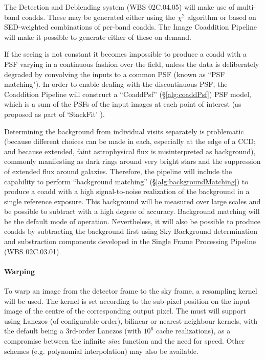 \documentclass[12pt]{article}
\newcommand{\wbsSFM}{WBS 02C.03.01}
\newcommand{\wbsDetDeblend}{WBS 02C.04.05}
\begin{document}
The Detection and Deblending system (\wbsDetDeblend) will make use of multi-band coadds. These may be generated either using the $\chi^2$ algorithm \cite{Szalay99} or based on SED-weighted combinations of per-band coadds. The Image Coaddition Pipeline will make it possible to generate either of these on demand.

If the seeing is not constant it becomes impossible to produce a coadd with a PSF varying in a continuous fashion over the field, unless the data is deliberately degraded by convolving the inputs to a common PSF (known as ``PSF matching").  In order to enable dealing with the discontinuous PSF, the Coaddition Pipeline will construct a ``CoaddPsf'' (\S\ref{alg:coaddPsf}) PSF model, which is a sum of the PSFs of the input images at each point of interest (as proposed as part of `StackFit' \cite{Jee13}).

Determining the background from individual visits separately is problematic (because different choices can be made in each, especially at the edge of a CCD; and because extended, faint astrophysical flux is misinterpreted as background), commonly manifesting as dark rings around very bright stars and the suppression of extended flux around galaxies. Therefore, the pipeline will include the capability to perform ``background matching'' (\S\ref{alg:backgroundMatching}) to produce a coadd with a high signal-to-noise realization of the background in a single reference exposure.  This background will be measured over large scales and be possible to subtract with a high degree of accuracy. Background matching will be the default mode of operation. Nevertheless, it will also be possible to produce coadds by subtracting the background first using Sky Background determination and substraction components developed in the Single Frame Processing Pipeline (\wbsSFM).




\paragraph{Warping}
\label{alg:warp}

To warp an image from the detector frame to the sky frame, a resampling kernel will be used. The kernel is set according to the sub-pixel position on the input image of the centre of the corresponding output pixel.  The must will support using Lanczos (of configurable order), bilinear or nearest-neighbour kernels, with the default being a 3rd-order Lanczos (with $10^6$ cache realizations), as a compromise between the infinite {\em sinc} function and the need for speed. Other schemes (e.g. polynomial interpolation) may also be available.
\end{document}

